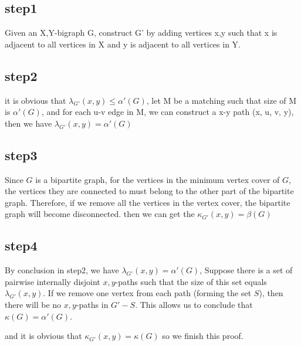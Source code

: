 \documentclass{article}
\begin{document}
\begin{CJK*}{UTF8}{bkai}
\subsection*{step1}
Given an X,Y-bigraph G, construct G' by adding vertices x,y such that x is adjacent to all
vertices in X and y is adjacent to all vertices in Y.
\subsection*{step2}
it is obvious that $\lambda_{G'}(x , y) \leq \alpha'(G)$, let M be a matching such that size of M is $\alpha'(G)$, and for each u-v edge in M, we can construct a x-y path ({x, u, v, y}), then we have $\lambda_{G'}(x , y) = \alpha'(G)$
\subsection*{step3}
Since \( G \) is a bipartite graph, for the vertices in the minimum vertex cover of \( G \), the vertices they are connected to must belong to the other part of the bipartite graph. Therefore, if we remove all the vertices in the vertex cover, the bipartite graph will become disconnected.
then we can get the $\kappa_{G'}(x,y) = \beta(G)$
\subsection*{step4}
By conclusion in step2, we have $\lambda_{G'}(x , y) = \alpha'(G)$, Suppose there is a set of pairwise internally disjoint \(x, y\)-paths such that the size of this set equals \( \lambda_{G'}(x, y) \). If we remove one vertex from each path (forming the set \(S\)), then there will be no \(x, y\)-paths in \(G' - S\). This allows us to conclude that \( \kappa(G) = \alpha'(G) \).

and it is obvious that $\kappa_{G'}(x,y) = \kappa(G)$ so we finish this proof.
\end{CJK*}
\end{document}
